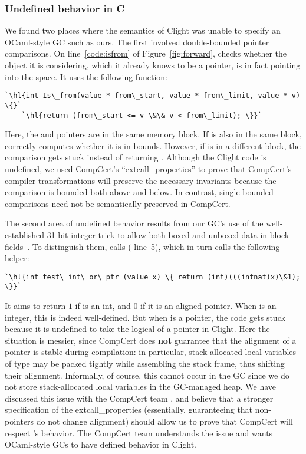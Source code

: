 \subsubsection*{Undefined behavior in C} %
We found two places where the semantics of Clight was unable to specify an OCaml-style GC such as ours.
The first involved double-bounded pointer comparisons.
On line~\ref{code:isfrom} of Figure~\ref{fig:forward},  checks 
whether the object it is considering, which it already knows to be a pointer,
is in fact pointing into the  space. It uses the following function:
\begin{lstlisting}[numbers=none]
  `\hl{int Is\_from(value * from\_start, value * from\_limit, value * v) \{}`
    `\hl{return (from\_start <= v \&\& v < from\_limit); \}}`
\end{lstlisting}
Here, the  and  pointers are in the same
memory block. If  is also in the same block, 
correctly computes whether it is in bounds.
However, if  is in a different block, the comparison gets stuck instead of
returning .
Although the Clight code is undefined, we used CompCert's ``extcall{\_}properties''
to prove that CompCert's compiler transformations will preserve the necessary invariants
because the comparison is bounded both above and below. In contrast, single-bounded
comparisons need not be semantically preserved in CompCert.

The second area of undefined behavior results from our GC's use of the well-established
31-bit integer trick to allow both boxed and unboxed data in block fields~\cite{realworldocaml}.
To distinguish them,  calls  ({\color{black} line~5}), which
in turn calls the following helper:
\begin{lstlisting}[numbers=none]
  `\hl{int test\_int\_or\_ptr (value x) \{ return (int)(((intnat)x)\&1); \}}`
\end{lstlisting}
It aims to return $1$ if  is an int, and $0$ if it is an aligned pointer.
When  is an integer, this is indeed well-defined. 
But when  is a pointer, the code gets stuck because
it is undefined to take the logical  of a pointer in Clight.
Here the situation is messier,
since CompCert does \textbf{not} guarantee that the alignment of a pointer is stable during
compilation: in particular, stack-allocated local variables of type  may be packed
tightly while assembling the stack frame, thus shifting their alignment.  Informally, of course,
this cannot occur in the GC since we do not store stack-allocated local variables in the GC-managed
heap.  We have discussed this issue with the CompCert team \cite{leroy_email}, and believe that
a stronger specification of the extcall{\_}properties (essentially, guaranteeing that non- pointers do not change alignment) should allow us to prove that CompCert
will respect 's behavior.  The CompCert team understands the
issue and wants OCaml-style GCs to have defined behavior in Clight.

